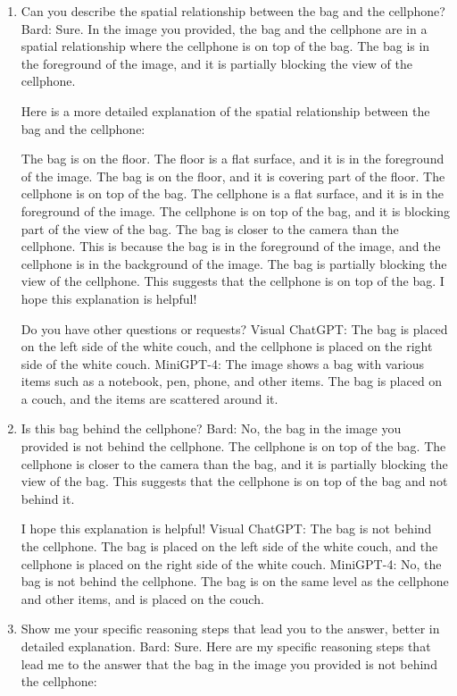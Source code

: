 \begin{enumerate}
    \item Can you describe the spatial relationship between the bag and the cellphone?
    \subitem Bard: Sure. In the image you provided, the bag and the cellphone are in a spatial relationship where the cellphone is on top of the bag. The bag is in the foreground of the image, and it is partially blocking the view of the cellphone.

    Here is a more detailed explanation of the spatial relationship between the bag and the cellphone:
    
    The bag is on the floor. The floor is a flat surface, and it is in the foreground of the image. The bag is on the floor, and it is covering part of the floor.
    The cellphone is on top of the bag. The cellphone is a flat surface, and it is in the foreground of the image. The cellphone is on top of the bag, and it is blocking part of the view of the bag.
    The bag is closer to the camera than the cellphone. This is because the bag is in the foreground of the image, and the cellphone is in the background of the image.
    The bag is partially blocking the view of the cellphone. This suggests that the cellphone is on top of the bag.
    I hope this explanation is helpful!
    
    Do you have other questions or requests?
    \subitem Visual ChatGPT: The bag is placed on the left side of the white couch, and the cellphone is placed on the right side of the white couch.
    \subitem MiniGPT-4: The image shows a bag with various items such as a notebook, pen, phone, and other items. The bag is placed on a couch, and the items are scattered around it.
    \item Is this bag behind the cellphone?
    \subitem Bard: No, the bag in the image you provided is not behind the cellphone. The cellphone is on top of the bag. The cellphone is closer to the camera than the bag, and it is partially blocking the view of the bag. This suggests that the cellphone is on top of the bag and not behind it.

    I hope this explanation is helpful!
    \subitem Visual ChatGPT: The bag is not behind the cellphone. The bag is placed on the left side of the white couch, and the cellphone is placed on the right side of the white couch.
    \subitem MiniGPT-4: No, the bag is not behind the cellphone. The bag is on the same level as the cellphone and other items, and is placed on the couch.
    \item Show me your specific reasoning steps that lead you to the answer, better in detailed explanation.
    \subitem Bard: 
    Sure. Here are my specific reasoning steps that lead me to the answer that the bag in the image you provided is not behind the cellphone:
    

\end{enumerate}
